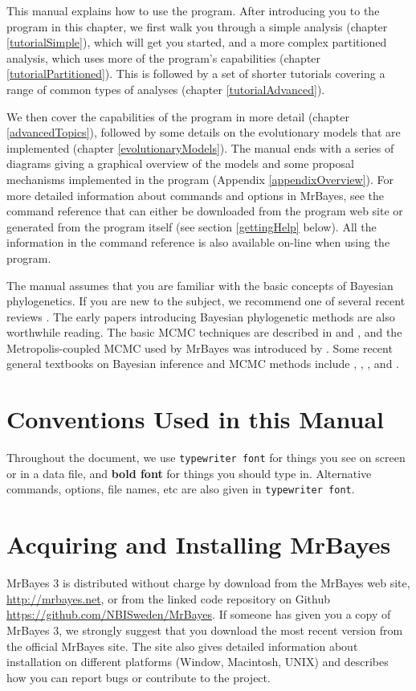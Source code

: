 \documentclass[12pt]{book}
\begin{document}
This manual explains how to use the program. After introducing you to the program in this
chapter, we first walk you through a simple analysis (chapter \ref{tutorialSimple}),
which will get you started, and a more complex partitioned analysis, which uses more of the program's
capabilities (chapter \ref{tutorialPartitioned}). This is followed by a set of shorter tutorials covering
a range of common types of analyses (chapter \ref{tutorialAdvanced}). 

We then cover the capabilities of the program in more detail (chapter \ref{advancedTopics}), followed by
some details on the evolutionary models that are implemented (chapter \ref{evolutionaryModels}). The
manual ends with a series of diagrams giving a graphical overview of the models and some proposal
mechanisms implemented in the program (Appendix \ref{appendixOverview}). For more detailed information
about commands and options in MrBayes, see the command reference that can either be
downloaded from the program web site or generated from the program itself (see section
\ref{gettingHelp} below). All the information in the command reference is also available
on-line when using the program.

The manual assumes that you are familiar with the basic concepts of Bayesian
phylogenetics. If you are new to the subject, we recommend one of several recent reviews
\citep{lewis01, holder03, ronquist10}. The early papers introducing Bayesian phylogenetic
methods \citep{li96, mau96, rannala96, mau97,
larget99, mau99, newton99} are also worthwhile reading. The
basic MCMC techniques are described in \citet{metropolis53} and
\citet{hastings70}, and the Metropolis-coupled MCMC used by MrBayes was introduced by
\citet{geyer91}. Some recent general textbooks on Bayesian inference and MCMC methods
include \citet{gilks96a}, \citet{carlin00}, \citet{gelman03},
and \citet{gamerman06}.


\section{Conventions Used in this Manual}
Throughout the document, we use \texttt{typewriter font} for things you see on screen or in a data
file, and \textbf{bold font} for things you should type in. Alternative commands, options, file names, etc
are also given in \texttt{typewriter font}.

\section{Acquiring and Installing MrBayes}
MrBayes 3 is distributed without charge by download from the MrBayes web site,
\url{http://mrbayes.net}, or from the linked code repository on Github \url{https://github.com/NBISweden/MrBayes}.
If someone has given you a copy of MrBayes 3, we strongly suggest that you download
the most recent version from the official MrBayes site. The site also gives detailed
information about installation on different platforms (Window, Macintosh, UNIX) and 
describes how you can report bugs or contribute to the project.
\end{document}
